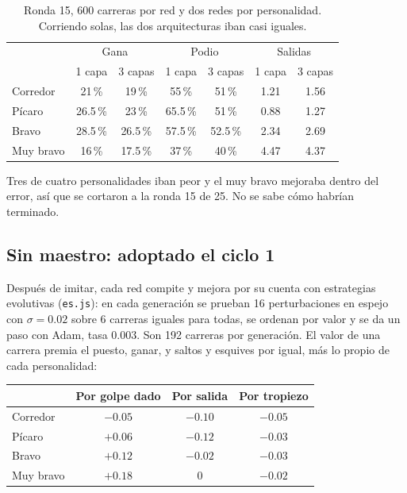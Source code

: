 \documentclass[11pt,letterpaper]{article}
\begin{document}
\begin{table}[h]\centering\small
\begin{tabular}{lcccccc}
\toprule
 & \multicolumn{2}{c}{Gana} & \multicolumn{2}{c}{Podio} & \multicolumn{2}{c}{Salidas} \\
 & 1 capa & 3 capas & 1 capa & 3 capas & 1 capa & 3 capas \\
\midrule
Corredor & 21\,\% & 19\,\% & 55\,\% & 51\,\% & 1.21 & 1.56 \\
Pícaro & 26.5\,\% & 23\,\% & 65.5\,\% & 51\,\% & 0.88 & 1.27 \\
Bravo & 28.5\,\% & 26.5\,\% & 57.5\,\% & 52.5\,\% & 2.34 & 2.69 \\
Muy bravo & 16\,\% & 17.5\,\% & 37\,\% & 40\,\% & 4.47 & 4.37 \\
\bottomrule
\end{tabular}
\caption{Ronda 15, 600 carreras por red y dos redes por personalidad. Corriendo solas, las dos arquitecturas iban casi iguales.}
\end{table}

Tres de cuatro personalidades iban peor y el muy bravo mejoraba dentro del error, así que se cortaron a la ronda 15 de 25. No se sabe cómo habrían terminado.

\subsection{Sin maestro: adoptado el ciclo 1}
Después de imitar, cada red compite y mejora por su cuenta con estrategias evolutivas (\texttt{es.js}): en cada generación se prueban 16 perturbaciones en espejo con $\sigma = 0.02$ sobre 6 carreras iguales para todas, se ordenan por valor y se da un paso con Adam, tasa $0.003$. Son 192 carreras por generación. El valor de una carrera premia el puesto, ganar, y saltos y esquives por igual, más lo propio de cada personalidad:
\begin{center}\small
\begin{tabular}{lccc}
\toprule
 & Por golpe dado & Por salida & Por tropiezo \\
\midrule
Corredor & $-0.05$ & $-0.10$ & $-0.05$ \\
Pícaro & $+0.06$ & $-0.12$ & $-0.03$ \\
Bravo & $+0.12$ & $-0.02$ & $-0.03$ \\
Muy bravo & $+0.18$ & $0$ & $-0.02$ \\
\bottomrule
\end{tabular}
\end{center}
\end{document}
